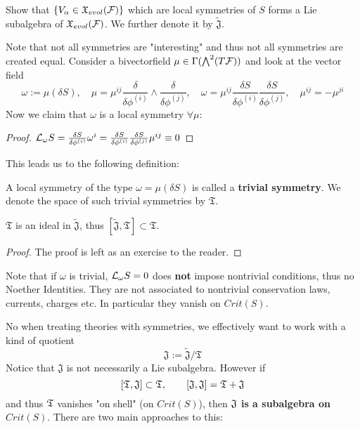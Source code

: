 \begin{ex}
  Show that $\{V_\alpha \in \mathfrak{X}_{evol}({\mathcal{F}})\}$ which are local symmetries of $S$ forms a Lie subalgebra of $\mathfrak{X}_{evol}({\mathcal{F}})$. We further denote it by $\widetilde{\mathfrak{J}}$.
\end{ex}

Note that not all symmetries are "interesting" and thus not all symmetries are created equal. Consider a bivectorfield $\mu \in \Gamma(\bigwedge^2 (T{\mathcal{F}}))$ and look at the vector field
$$ \omega := \mu(\delta S), \quad \mu = \mu^{ij} \frac{\delta}{\delta \phi^{(i)}} \wedge \frac{\delta}{\delta \phi^{(j)}}, \quad \omega = \mu^{ij} \frac{\delta S}{\delta \phi^{(i)}} \frac{\delta S}{\delta \phi^{(j)}}, \quad \mu^{ij} = - \mu^{ji} $$
Now we claim that $\omega$ is a local symmetry $\forall \mu$:

\begin{proof}
  $\lie{\omega} S = \frac{\delta S}{\delta \phi^{(i)}} \omega^i = \frac{\delta S}{\delta \phi^{(i)}} \frac{\delta S}{\delta \phi^{(j)}} \mu^{ij} \equiv 0$
\end{proof}

This leads us to the following definition:

\begin{definition}
  A local symmetry of the type $\omega = \mu(\delta S)$ is called a \textbf{trivial symmetry}. We denote the space of such trivial symmetries by $\mathfrak{T}$.
\end{definition}

\begin{lem}
  $\mathfrak{T}$ is an ideal in $\widetilde{\mathfrak{J}}$, thus $[\widetilde{\mathfrak{J}}, \mathfrak{T}] \subset \mathfrak{T}$.
\begin{proof}
  The proof is left as an exercise to the reader.
\end{proof}
\end{lem}

\begin{rem}
  Note that if $\omega$ is trivial, $\mathcal{L}_{\omega}S = 0$ does \textbf{not} impose nontrivial conditions, thus no Noether Identities. They are not associated to nontrivial conservation laws, currents, charges etc. In particular they vanish on $Crit(S)$.
\end{rem}

No when treating theories with symmetries, we effectively want to work with a kind of quotient
$$ \mathfrak{J} := \widetilde{\mathfrak{J}}/\mathfrak{T}$$
Notice that $\mathfrak{J}$ is not necessarily a Lie subalgebra. However if
$$ [\mathfrak{T}, \mathfrak{J}] \subset \mathfrak{T}, \quad \quad [\mathfrak{J}, \mathfrak{J}] = \mathfrak{T} + \mathfrak{J} $$
and thus $\mathfrak{T}$ vanishes "on shell" (on $Crit(S)$), then \textbf{$\mathfrak{J}$ is a subalgebra on $Crit(S)$}. There are two main approaches to this:

